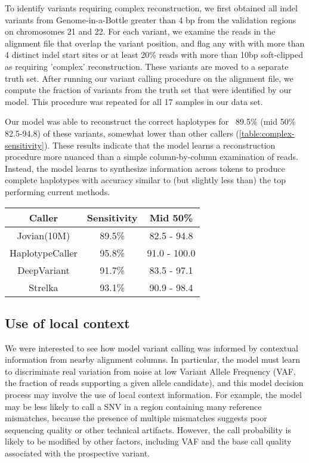 \documentclass[]{article}
\begin{document}
To identify variants requiring complex reconstruction, we first obtained all indel variants from Genome-in-a-Bottle greater than 4 bp from the validation regions on chromosomes 21 and 22. For each variant, we examine the reads in the alignment file that overlap the variant position, and flag any with with more than 4 distinct indel start sites or at least 20\% reads with more than 10bp soft-clipped as requiring 'complex' reconstruction. These variants are moved to a separate truth set. After running our variant calling procedure on the alignment file, we compute the fraction of variants from the truth set that were identified by our model. This procedure was repeated for all 17 samples in our data set. 

Our model was able to reconstruct the correct haplotypes for ~89.5\% (mid 50\% 82.5-94.8) of these variants, somewhat lower than other callers (\ref{table:complex-sensitivity}).  These results indicate that the model learns a reconstruction procedure more nuanced than a simple column-by-column examination of reads. Instead, the model learns to synthesize information across tokens to produce complete haplotypes with accuracy similar to (but slightly less than) the top performing current methods. 

\begin{center}
	\begin{tabular}{ ccc }
	 Caller & Sensitivity & Mid 50\%  \\ 
	\hline
	 Jovian(10M) & 89.5\% & 82.5 - 94.8 \\ 
	 HaplotypeCaller & 95.8\% & 91.0 - 100.0  \\ 
	 DeepVariant & 91.7\% & 83.5 - 97.1  \\ 
	 Strelka & 93.1\% & 90.9 - 98.4 \\
	 \hline
	\end{tabular}
	\label{table:complex-sensitivity}
\end{center}

\subsection{Use of local context}
 
We were interested to see how model variant calling was informed by contextual information from nearby alignment columns. In particular, the model must learn to discriminate real variation from noise at low Variant Allele Frequency (VAF, the fraction of reads supporting a given allele candidate), and this model decision process may involve the use of local context information. For example, the model may be less likely to call a SNV in a region containing many reference mismatches, because the presence of multiple mismatches suggests poor sequencing quality or other technical artifacts. However, the call probability is likely to be modified by other factors, including VAF and the base call quality associated with the prospective variant.   
\end{document}
